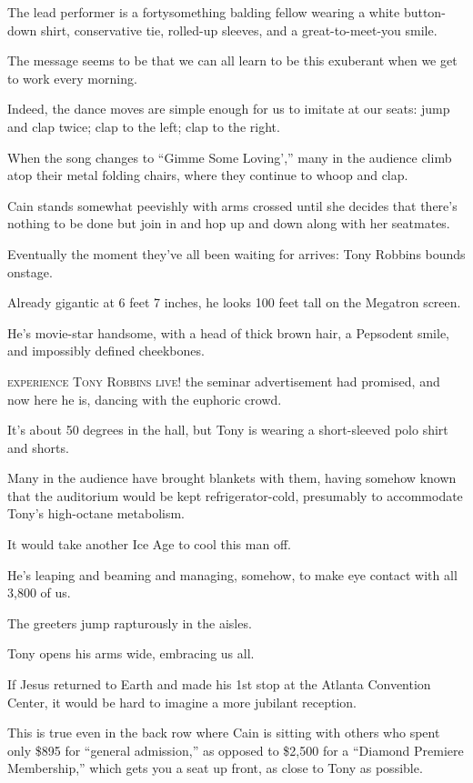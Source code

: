 \documentclass[oneside]{article}
\numberwithin{equation}{section}
\begin{document}
The lead performer is a fortysomething balding fellow wearing a white button-down shirt, conservative tie, rolled-up sleeves, and a great-to-meet-you smile.

The message seems to be that we can all learn to be this exuberant when we get to work every morning.

%
Indeed, the dance moves are simple enough for us to imitate at our seats: jump and clap twice; clap to the left; clap to the right.

When the song changes to ``Gimme Some Loving','' many in the audience climb atop their metal folding chairs, where they continue to whoop and clap.

Cain stands somewhat peevishly with arms crossed until she decides that there's nothing to be done but join in and hop up and down along with her seatmates.

%
Eventually the moment they've all been waiting for arrives: Tony Robbins bounds onstage.

Already gigantic at 6 feet 7 inches, he looks 100 feet tall on the Megatron screen.

He's movie-star handsome, with a head of thick brown hair, a Pepsodent smile, and impossibly defined cheekbones.

\textsc{experience Tony Robbins live!} the seminar advertisement had promised, and now here he is, dancing with the euphoric crowd.

%
It's about 50 degrees in the hall, but Tony is wearing a short-sleeved polo shirt and shorts.

Many in the audience have brought blankets with them, having somehow known that the auditorium would be kept refrigerator-cold, presumably to accommodate Tony's high-octane metabolism.

It would take another Ice Age to cool this man off.

He's leaping and beaming and managing, somehow, to make eye contact with all 3,800 of us.

The greeters jump rapturously in the aisles.

Tony opens his arms wide, embracing us all.

If Jesus returned to Earth and made his 1st stop at the Atlanta Convention Center, it would be hard to imagine a more jubilant reception.

%
This is true even in the back row where Cain is sitting with others who spent only \$895 for ``general admission,'' as opposed to \$2,500 for a ``Diamond Premiere Membership,'' which gets you a seat up front, as close to Tony as possible.
\end{document}
